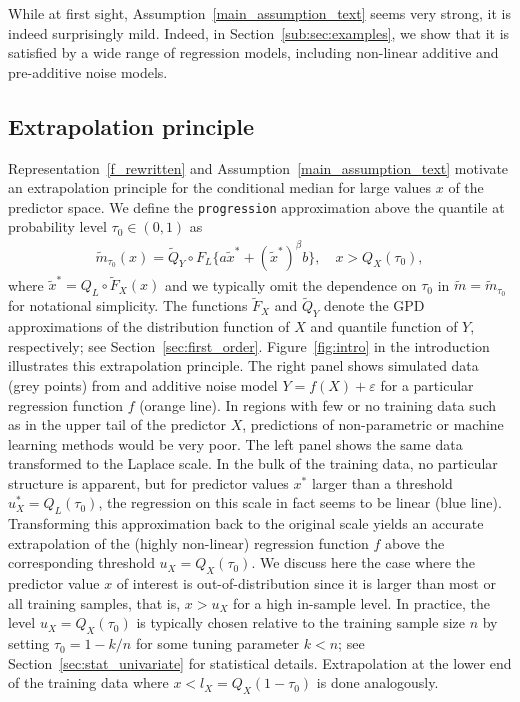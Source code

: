 \documentclass{statsoc}
\theoremstyle{break}
\newcommand{\tauzero}{\tau_0}
\begin{document}
While at first sight, Assumption~\ref{main_assumption_text} seems very strong, it is indeed surprisingly mild. Indeed, in Section~\ref{sub:sec:examples}, we show that it is satisfied by a wide range of  regression models, including non-linear additive and pre-additive noise models. 

 





\subsection{Extrapolation principle}
\label{sec:extrapolation:principle}

Representation~\eqref{f_rewritten} and Assumption~\ref{main_assumption_text} 
motivate an extrapolation principle for the conditional median for large values $x$ of the predictor space. 
We define the \texttt{progression} approximation above the quantile at probability level $\tau_0\in(0,1)$ as
\begin{align}\label{extr_pinciple}
	\tilde m_{\tauzero}(x) =
	\tilde Q_Y \circ F_L\{ a \tilde x^* + (\tilde x^*)^\beta b \}, \quad x > Q_X(\tau_0),
\end{align}
 where $\tilde x^* = Q_L \circ \tilde F_X(x)$ and we typically omit the dependence on $\tau_0$ in $\tilde m = \tilde m_{\tau_0}$ for notational simplicity.
 The functions $\tilde F_X$ and $\tilde Q_Y$ denote the GPD approximations of the distribution function of $X$ and quantile function of $Y$, respectively; see Section~\ref{sec:first_order}.
Figure~\ref{fig:intro} in the introduction illustrates this extrapolation principle. The right panel shows simulated data (grey points) from and additive noise model $Y = f(X) + \varepsilon$ for a particular regression function $f$ (orange line). In regions with few or no training data such as in the upper tail of the predictor $X$, predictions of non-parametric or machine learning methods would be very poor. 
The left panel shows the same data transformed to the Laplace scale.
In the bulk of the training data, no particular structure is apparent, but for predictor values $x^*$ larger than a threshold $u_{X}^* =  Q_L(\tauzero)$, the regression on this scale in fact seems to be linear (blue line). Transforming this approximation back to the original scale yields an accurate extrapolation of the (highly non-linear) regression function $f$ above the corresponding threshold $u_X = Q_X(\tauzero)$.
We discuss here the case where the predictor value $x$ of interest is out-of-distribution since it is larger than most or all training samples, that is, $x > u_X$ for a high in-sample level.
In practice, the level $u_X =  Q_X(\tauzero)$ is typically chosen relative to the training sample size $n$ by setting $\tauzero = 1-k/n$ for some tuning parameter $k<n$; see Section~\ref{sec:stat_univariate}
for statistical details. 
Extrapolation at the lower end of the training data where $x < l_X = Q_X(1-\tauzero)$ is done analogously.
\end{document}
